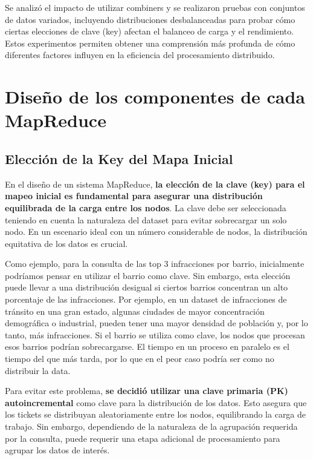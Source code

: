 \documentclass[a4paper,12pt]{article}
\begin{document}
	\bigskip
	
	Se analizó el impacto de utilizar combiners y se realizaron pruebas con conjuntos de datos variados, incluyendo distribuciones desbalanceadas para probar cómo ciertas elecciones de clave (key) afectan el balanceo de carga y el rendimiento. Estos experimentos permiten obtener una comprensión más profunda de cómo diferentes factores influyen en la eficiencia del procesamiento distribuido.
	

	\newpage
	
	\section{Diseño de los componentes de cada MapReduce}
	
	\subsection{Elección de la Key del Mapa Inicial}
	
	En el diseño de un sistema MapReduce, \textbf{la elección de la clave (key) para el mapeo inicial es fundamental para asegurar una distribución equilibrada de la carga entre los nodos}. La clave debe ser seleccionada teniendo en cuenta la naturaleza del dataset para evitar sobrecargar un solo nodo. En un escenario ideal con un número considerable de nodos, la distribución equitativa de los datos es crucial.
	
	\bigskip 
	
	Como ejemplo, para la consulta de las top 3 infracciones por barrio, inicialmente podríamos pensar en utilizar el barrio como clave. Sin embargo, esta elección puede llevar a una distribución desigual si ciertos barrios concentran un alto porcentaje de las infracciones. Por ejemplo, en un dataset de infracciones de tránsito en una gran estado, algunas ciudades de mayor concentración demográfica o  industrial, pueden tener una mayor densidad de población y, por lo tanto, más infracciones. Si el barrio se utiliza como clave, los nodos que procesan esos barrios podrían sobrecargarse. El tiempo en un proceso en paralelo es el tiempo del que más tarda, por lo que en el peor caso podría ser como no distribuir la data.
	
	\bigskip
	
	Para evitar este problema, \textbf{se decidió utilizar una clave primaria (PK) autoincremental} como clave para la distribución de los datos. Esto asegura que los tickets se distribuyan aleatoriamente entre los nodos, equilibrando la carga de trabajo. Sin embargo, dependiendo de la naturaleza de la agrupación requerida por la consulta, puede requerir una etapa adicional de procesamiento para agrupar los datos de interés.
	
\end{document}

